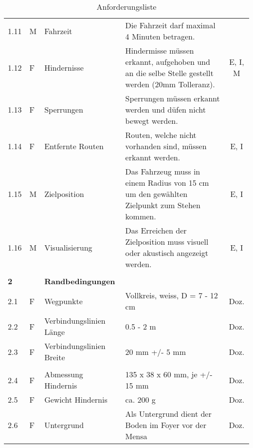 \documentclass{article}
\begin{document}
\begin{landscape}
\begin{table}[H]
\begin{tabular}{llp{4cm}p{15cm}c}
            1.11 & M & Fahrzeit & Die Fahrzeit darf maximal 4 Minuten betragen. & \\
            1.12 & F & Hindernisse & Hindermisse müssen erkannt, aufgehoben und an die selbe Stelle gestellt werden (20mm Tolleranz). & E, I, M \\
            1.13 & F & Sperrungen & Sperrungen müssen erkannt werden und düfen nicht bewegt werden. & \\
            1.14 & F & Entfernte Routen & Routen, welche nicht vorhanden sind, müssen erkannt werden. & E, I \\
            1.15 & M & Zielposition & Das Fahrzeug muss in einem Radius von 15 cm um den gewählten Zielpunkt zum Stehen kommen. & E, I \\
            1.16 & M & Visualisierung & Das Erreichen der Zielposition muss visuell oder akustisch angezeigt werden. & E, I \\

            \\
            \textbf{2} & & \textbf{Randbedingungen} \\
            2.1 & F & Wegpunkte & Vollkreis, weiss, D = 7 - 12 cm & Doz. \\
            2.2 & F & Verbindungslinien Länge & 0.5 - 2 m & Doz. \\
            2.3 & F & Verbindungslinien Breite & 20 mm +/- 5 mm & Doz. \\
            \\
            2.4 & F & Abmessung Hindernis & 135 x 38 x 60 mm, je +/- 15 mm & Doz. \\
            2.5 & F & Gewicht Hindernis & ca. 200 g & Doz. \\
            2.6 & F & Untergrund & Als Untergrund dient der Boden im Foyer vor der Mensa & Doz. \\

        \end{tabular}
        \caption{Anforderungsliste}
        \label{tab:my_label}
    \end{table}
\end{landscape} %
\end{document}
